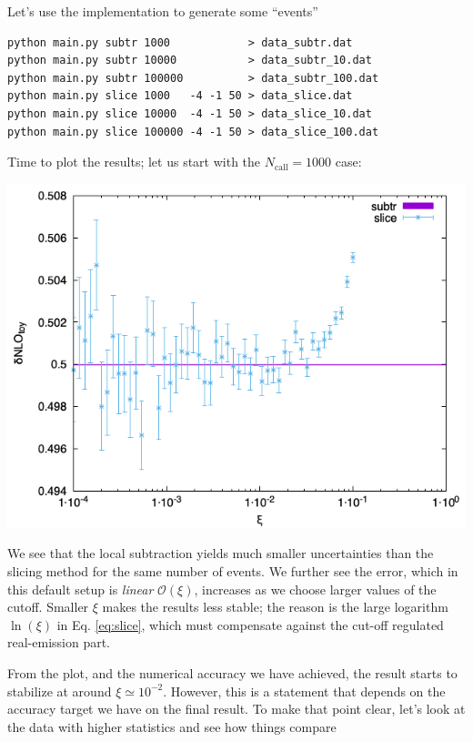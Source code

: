 \documentclass[11pt]{article}
\begin{document}
Let's use the implementation to generate some ``events''
\begin{verbatim}
python main.py subtr 1000            > data_subtr.dat
python main.py subtr 10000           > data_subtr_10.dat
python main.py subtr 100000          > data_subtr_100.dat
python main.py slice 1000   -4 -1 50 > data_slice.dat
python main.py slice 10000  -4 -1 50 > data_slice_10.dat
python main.py slice 100000 -4 -1 50 > data_slice_100.dat
\end{verbatim}
Time to plot the results; let us start with the \(N_\mathrm{call}=1000\) case:
\begin{center}
\includegraphics[width=.9\linewidth]{data.png}
\label{}
\end{center}
We see that the local subtraction yields much smaller uncertainties than the slicing method for the same number of events.
We further see the error, which in this default setup is \emph{linear} \(\mathcal{O}(\xi)\), increases as we choose larger values of the cutoff.
Smaller \(\xi\) makes the results less stable; the reason is the large logarithm \(\ln(\xi)\) in Eq. \eqref{eq:slice}, which must compensate against the cut-off regulated real-emission part.

From the plot, and the numerical accuracy we have achieved, the result starts to stabilize at around \(\xi \simeq 10^{-2}\).
However, this is a statement that depends on the accuracy target we have on the final result.
To make that point clear, let's look at the data with higher statistics and see how things compare
\end{document}
